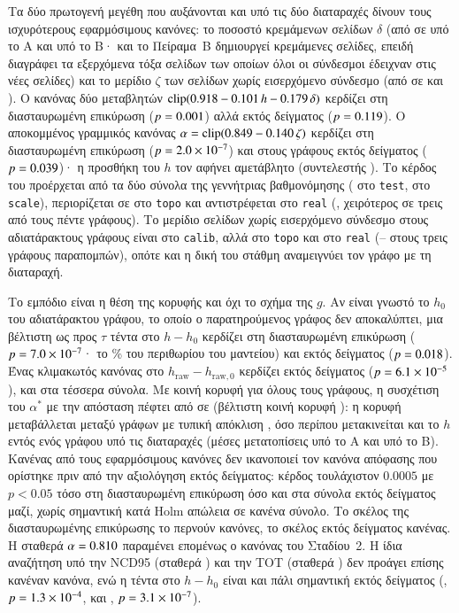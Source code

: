 \documentclass[11pt,a4paper]{article}
\theoremstyle{definition}
\theoremstyle{remark}
\newcommand{\clip}{\mathrm{clip}}
\begin{document}
Τα δύο πρωτογενή μεγέθη που αυξάνονται και υπό τις δύο διαταραχές δίνουν τους ισχυρότερους εφαρμόσιμους
κανόνες: το ποσοστό κρεμάμενων σελίδων $\delta$ (από \NmDangFull{} σε \NmDangSevA{} υπό το Α και
\NmDangSevB{} υπό το Β· και το Πείραμα~Β δημιουργεί κρεμάμενες σελίδες, επειδή διαγράφει τα εξερχόμενα
τόξα σελίδων των οποίων όλοι οι σύνδεσμοι έδειχναν στις νέες σελίδες) και το μερίδιο $\zeta$ των σελίδων
χωρίς εισερχόμενο σύνδεσμο (από \NmZinFull{} σε \NmZinSevA{} και \NmZinSevB). Ο κανόνας δύο μεταβλητών
$\clip(\NmBilinDeltaA\NmBilinDeltaH\,h\NmBilinDeltaD\,\delta)$ κερδίζει \NmBilinCV{} στη διασταυρωμένη
επικύρωση ($p=0.001$) αλλά \NmBilinHeld{} εκτός δείγματος ($p=0.119$). Ο αποκομμένος
γραμμικός κανόνας $\alpha=\clip(\NmZetaA\NmZetaB\,\zeta)$ κερδίζει \NmZetaCV{} στη διασταυρωμένη
επικύρωση ($p=2.0\times10^{-7}$) και \NmZetaHeld{} στους γράφους εκτός δείγματος ($p=0.039$)· η
προσθήκη του $h$ τον αφήνει αμετάβλητο (συντελεστής \NmBilinZetaH). Το κέρδος του προέρχεται από τα δύο
σύνολα της γεννήτριας βαθμονόμησης (\NmZetaTest{} στο \texttt{test}, \NmZetaScale{} στο \texttt{scale}),
περιορίζεται σε \NmZetaTopo{} στο \texttt{topo} και αντιστρέφεται στο \texttt{real} (\NmZetaReal,
χειρότερος σε τρεις από τους πέντε γράφους). Το μερίδιο σελίδων χωρίς εισερχόμενο σύνδεσμο στους
αδιατάρακτους γράφους είναι \NmZinUnpertCalib{} στο \texttt{calib}, αλλά \NmZinUnpertTopo{} στο
\texttt{topo} και \NmZinUnpertReal{} στο \texttt{real} (\NmZinCiteMin--\NmZinCiteMax{} στους τρεις
γράφους παραπομπών), οπότε και η δική του στάθμη αναμειγνύει τον γράφο με τη διαταραχή.

Το εμπόδιο είναι η θέση της κορυφής και όχι το σχήμα της $g$. Αν είναι γνωστό το $h_0$ του αδιατάρακτου
γράφου, το οποίο ο παρατηρούμενος γράφος δεν αποκαλύπτει, μια βέλτιστη ως προς $\tau$ τέντα στο $h-h_0$
κερδίζει \NmDhCV{} στη διασταυρωμένη επικύρωση ($p=7.0\times10^{-7}$· το \NmDhShare\% του περιθωρίου
\NmOracleCalib{} του μαντείου) και \NmDhHeld{} εκτός δείγματος ($p=0.018$). Ένας κλιμακωτός κανόνας
στο $h_{\mathrm{raw}}-h_{\mathrm{raw},0}$ κερδίζει \NmDhrawHeld{} εκτός δείγματος ($p=6.1\times10^{-5}$),
και στα τέσσερα σύνολα. Με κοινή κορυφή για όλους τους γράφους, η συσχέτιση του $\alpha^*$ με την
απόσταση πέφτει από \NmDistOwn{} σε \NmDistGlobal{} (βέλτιστη κοινή κορυφή \NmDistGlobalC): η κορυφή
μεταβάλλεται μεταξύ γράφων με τυπική απόκλιση \NmHzeroSd, όσο περίπου μετακινείται και το $h$ εντός
ενός γράφου υπό τις διαταραχές (μέσες μετατοπίσεις \NmExcA{} υπό το Α και \NmExcB{} υπό το Β). Κανένας από τους \NmRules{} εφαρμόσιμους κανόνες
δεν ικανοποιεί τον κανόνα απόφασης που ορίστηκε πριν από την αξιολόγηση εκτός δείγματος: κέρδος
τουλάχιστον $0.0005$ με $p<0.05$ τόσο στη διασταυρωμένη επικύρωση όσο και στα σύνολα εκτός δείγματος
μαζί, χωρίς σημαντική κατά Holm απώλεια σε κανένα σύνολο. Το σκέλος της διασταυρωμένης επικύρωσης το
περνούν \NmMeetsCV{} κανόνες, το σκέλος εκτός δείγματος κανένας. Η σταθερά $\alpha=0.810$
παραμένει επομένως ο κανόνας του Σταδίου~2. Η ίδια αναζήτηση υπό την NCD95 (σταθερά \NmNfConst) και την
TOT (σταθερά \NmTotConst) δεν προάγει επίσης κανέναν κανόνα, ενώ η τέντα στο $h-h_0$ είναι και πάλι
σημαντική εκτός δείγματος (\NmNfDhHeld, $p=1.3\times10^{-4}$, και \NmTotDhHeld, $p=3.1\times10^{-7}$).
\end{document}
